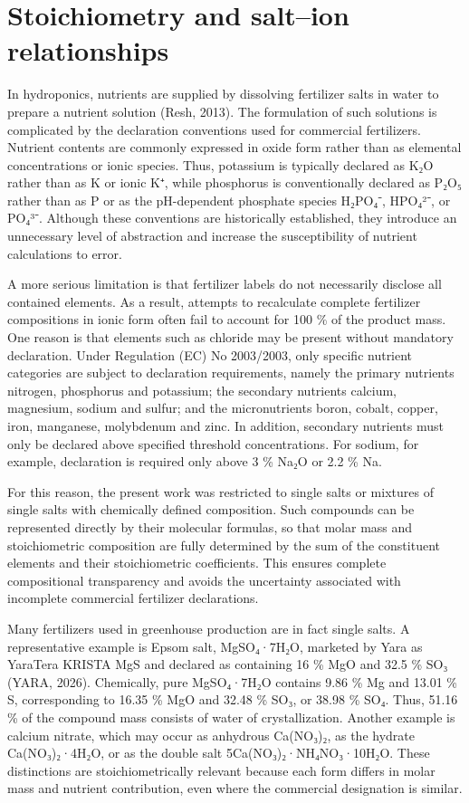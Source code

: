 \documentclass[
  letterpaper,
  DIV=11,
  numbers=noendperiod]{scrreprt}
\begin{document}
\section{Stoichiometry and salt--ion
relationships}\label{stoichiometry-and-saltion-relationships}

In hydroponics, nutrients are supplied by dissolving fertilizer salts in
water to prepare a nutrient solution (Resh, 2013). The formulation of
such solutions is complicated by the declaration conventions used for
commercial fertilizers. Nutrient contents are commonly expressed in
oxide form rather than as elemental concentrations or ionic species.
Thus, potassium is typically declared as K₂O rather than as K or ionic
K⁺, while phosphorus is conventionally declared as P₂O₅ rather than as P
or as the pH-dependent phosphate species H₂PO₄⁻, HPO₄²⁻, or PO₄³⁻.
Although these conventions are historically established, they introduce
an unnecessary level of abstraction and increase the susceptibility of
nutrient calculations to error.

A more serious limitation is that fertilizer labels do not necessarily
disclose all contained elements. As a result, attempts to recalculate
complete fertilizer compositions in ionic form often fail to account for
100 \% of the product mass. One reason is that elements such as chloride
may be present without mandatory declaration. Under Regulation (EC) No
2003/2003, only specific nutrient categories are subject to declaration
requirements, namely the primary nutrients nitrogen, phosphorus and
potassium; the secondary nutrients calcium, magnesium, sodium and
sulfur; and the micronutrients boron, cobalt, copper, iron, manganese,
molybdenum and zinc. In addition, secondary nutrients must only be
declared above specified threshold concentrations. For sodium, for
example, declaration is required only above 3 \% Na₂O or 2.2 \% Na.

For this reason, the present work was restricted to single salts or
mixtures of single salts with chemically defined composition. Such
compounds can be represented directly by their molecular formulas, so
that molar mass and stoichiometric composition are fully determined by
the sum of the constituent elements and their stoichiometric
coefficients. This ensures complete compositional transparency and
avoids the uncertainty associated with incomplete commercial fertilizer
declarations.

Many fertilizers used in greenhouse production are in fact single salts.
A representative example is Epsom salt, MgSO₄·7H₂O, marketed by Yara as
YaraTera KRISTA MgS and declared as containing 16 \% MgO and 32.5 \% SO₃
(YARA, 2026). Chemically, pure MgSO₄·7H₂O contains 9.86 \% Mg and 13.01
\% S, corresponding to 16.35 \% MgO and 32.48 \% SO₃, or 38.98 \% SO₄.
Thus, 51.16 \% of the compound mass consists of water of
crystallization. Another example is calcium nitrate, which may occur as
anhydrous Ca(NO₃)₂, as the hydrate Ca(NO₃)₂·4H₂O, or as the double salt
5Ca(NO₃)₂·NH₄NO₃·10H₂O. These distinctions are stoichiometrically
relevant because each form differs in molar mass and nutrient
contribution, even where the commercial designation is similar.
\end{document}
